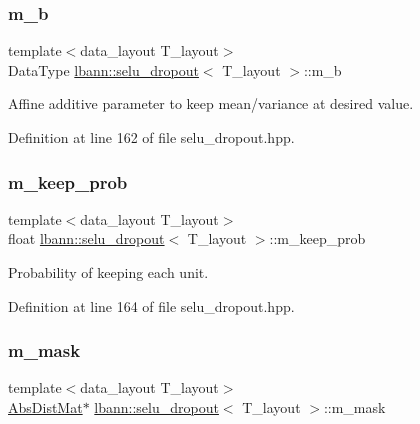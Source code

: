 \subsubsection{\texorpdfstring{m\+\_\+b}{m\_b}}
{\footnotesize\ttfamily template$<$data\+\_\+layout T\+\_\+layout$>$ \\
Data\+Type \hyperlink{classlbann_1_1selu__dropout}{lbann\+::selu\+\_\+dropout}$<$ T\+\_\+layout $>$\+::m\+\_\+b\hspace{0.3cm}{\ttfamily [private]}}

Affine additive parameter to keep mean/variance at desired value. 

Definition at line 162 of file selu\+\_\+dropout.\+hpp.

\mbox{\label{classlbann_1_1selu__dropout_a00bd2a07703e2e918af8ae68b58ff11b}} 
\subsubsection{\texorpdfstring{m\+\_\+keep\+\_\+prob}{m\_keep\_prob}}
{\footnotesize\ttfamily template$<$data\+\_\+layout T\+\_\+layout$>$ \\
float \hyperlink{classlbann_1_1selu__dropout}{lbann\+::selu\+\_\+dropout}$<$ T\+\_\+layout $>$\+::m\+\_\+keep\+\_\+prob\hspace{0.3cm}{\ttfamily [private]}}

Probability of keeping each unit. 

Definition at line 164 of file selu\+\_\+dropout.\+hpp.

\mbox{\label{classlbann_1_1selu__dropout_a31aaadbc51d78673a84390b48d4e5950}} 
\subsubsection{\texorpdfstring{m\+\_\+mask}{m\_mask}}
{\footnotesize\ttfamily template$<$data\+\_\+layout T\+\_\+layout$>$ \\
\hyperlink{base_8hpp_a9a697a504ae84010e7439ffec862b470}{Abs\+Dist\+Mat}$\ast$ \hyperlink{classlbann_1_1selu__dropout}{lbann\+::selu\+\_\+dropout}$<$ T\+\_\+layout $>$\+::m\+\_\+mask\hspace{0.3cm}{\ttfamily [private]}}

